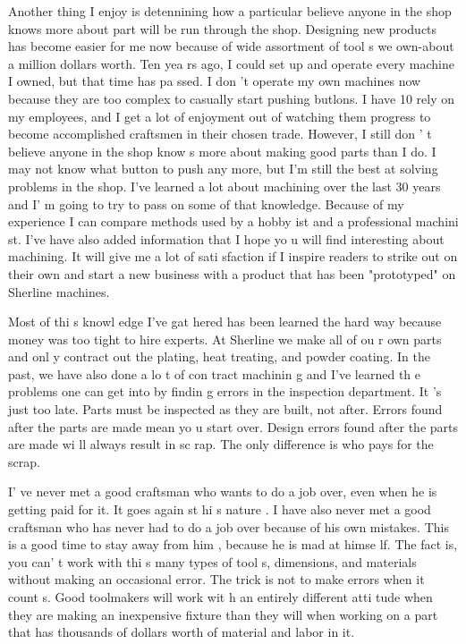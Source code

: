 Another thing I enjoy is detennining how a particular believe anyone in the shop
knows more about part will be run through the shop. Designing new products has
become easier for me now because of wide assortment of tool s we own-about a
million dollars worth. Ten yea rs ago, I could set up and operate every machine
I owned, but that time has pa ssed. I don 't operate my own machines now because
they are too complex to casually start pushing butlons. I have 10 rely on my
employees, and I get a lot of enjoyment out of watching them progress to become
accomplished craftsmen in their chosen trade. However, I still don ' t believe
anyone in the shop know s more about making good parts than I do. I may not know
what button to push any more, but I'm still the best at solving problems in the
shop. I've learned a lot about machining over the last 30 years and I' m going
to try to pass on some of that knowledge. Because of my experience I can compare
methods used by a hobby ist and a professional machini st. I've have also added
information that I hope yo u will find interesting about machining. It will give
me a lot of sati sfaction if I inspire readers to strike out on their own and
start a new business with a product that has been "prototyped" on Sherline
machines.


Most of thi s knowl edge I've gat hered has been learned the hard way because
money was too tight to hire experts. At Sherline we make all of ou r own parts
and onl y contract out the plating, heat treating, and powder coating. In the
past, we have also done a lo t of con tract machinin g and I've learned th e
problems one can get into by findin g errors in the inspection department. It 's
just too late. Parts must be inspected as they are built, not after. Errors
found after the parts are made mean yo u start over. Design errors found after
the parts are made wi ll always result in sc rap. The only difference is who
pays for the scrap.


I' ve never met a good craftsman who wants to do a job over, even when he is
getting paid for it. It goes again st hi s nature . I have also never met a good
craftsman who has never had to do a job over because of his own mistakes. This
is a good time to stay away from him , because he is mad at himse lf.
The fact is, you can' t work with thi s many types of tool s, dimensions, and
materials without making an occasional error. The trick is not to make errors
when it count s. Good toolmakers will work wit h an entirely different atti tude
when they are making an inexpensive fixture than they will when working on a
part that has thousands of dollars worth of material and labor in it.

